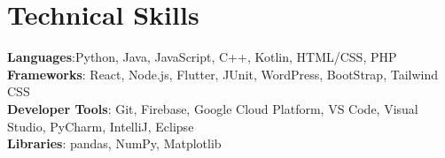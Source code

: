 \documentclass[letterpaper,11pt]{article}
\begin{document}
\section{Technical Skills}
 \begin{itemize}[leftmargin=0.15in, label={}]
    \small{\item{
     \textbf{Languages}{:Python, Java, JavaScript, C++, Kotlin,  HTML/CSS, PHP} \\ \vspace{3pt}
     \textbf{Frameworks}{: React, Node.js, Flutter, JUnit, WordPress, BootStrap, Tailwind CSS} \\ \vspace{3pt}
     \textbf{Developer Tools}{: Git, Firebase, Google Cloud Platform, VS Code, Visual Studio, PyCharm, IntelliJ, Eclipse} \\ \vspace{3pt}
     \textbf{Libraries}{: pandas, NumPy, Matplotlib}
    }}
 \end{itemize}



  
  
\end{document}
